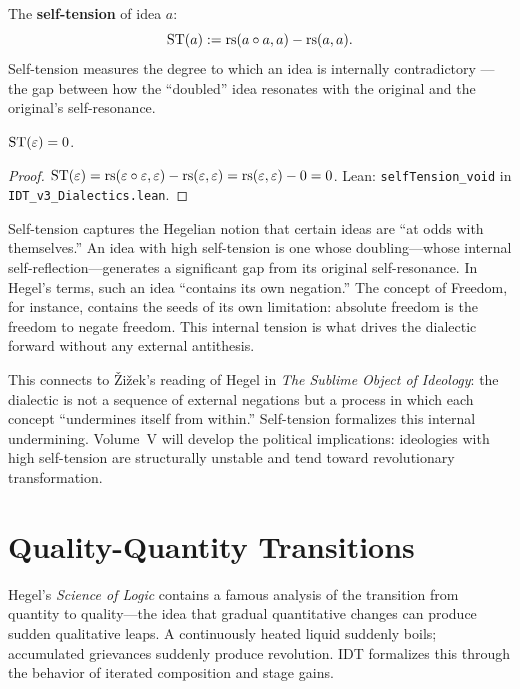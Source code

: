 \begin{definition}
\label{def:self-tension}
The \textbf{self-tension} of idea $a$:
\[
\mathrm{ST}(a) := \mathrm{rs}(a \circ a, a) - \mathrm{rs}(a, a).
\]
Self-tension measures the degree to which an idea is internally contradictory
---the gap between how the ``doubled'' idea resonates with the original and
the original's self-resonance.
\end{definition}

\begin{theorem}
\label{thm:self-tension-void}
$\mathrm{ST}(\varepsilon) = 0$.
\end{theorem}

\begin{proof}
$\mathrm{ST}(\varepsilon) = \mathrm{rs}(\varepsilon \circ \varepsilon, \varepsilon) - \mathrm{rs}(\varepsilon, \varepsilon)
= \mathrm{rs}(\varepsilon, \varepsilon) - 0 = 0$. Lean: \texttt{selfTension\_void} in
\texttt{IDT\_v3\_Dialectics.lean}.
\end{proof}

\begin{interpretation}
Self-tension captures the Hegelian notion that certain ideas are ``at odds
with themselves.'' An idea with high self-tension is one whose doubling---whose
internal self-reflection---generates a significant gap from its original
self-resonance. In Hegel's terms, such an idea ``contains its own negation.''
The concept of Freedom, for instance, contains the seeds of its own limitation:
absolute freedom is the freedom to negate freedom. This internal tension is
what drives the dialectic forward without any external antithesis.

This connects to \v{Z}i\v{z}ek's reading of Hegel in \textit{The Sublime
Object of Ideology}: the dialectic is not a sequence of external negations
but a process in which each concept ``undermines itself from within.''
Self-tension formalizes this internal undermining. Volume~V will develop the
political implications: ideologies with high self-tension are structurally
unstable and tend toward revolutionary transformation.
\end{interpretation}

\section{Quality-Quantity Transitions}

Hegel's \textit{Science of Logic} contains a famous analysis of the transition
from quantity to quality---the idea that gradual quantitative changes can
produce sudden qualitative leaps. A continuously heated liquid suddenly boils;
accumulated grievances suddenly produce revolution. IDT formalizes this through
the behavior of iterated composition and stage gains.

